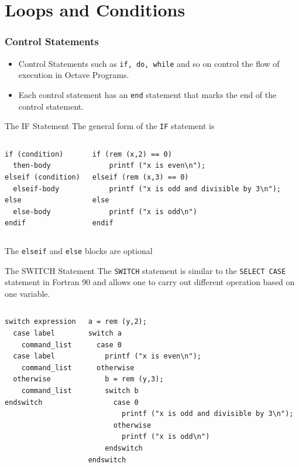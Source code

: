 \documentclass[t,compress,xcolor=svgnames]{beamer}
\newenvironment{eblock}[0]
{
\begin{beamerboxesrounded}[upper=uppercol2,lower=lowercol2,shadow=true]}
{\end{beamerboxesrounded}}
\begin{document}
\section{Loops and Conditions}
\begin{frame}
  \frametitle{\small Control Statements}
  \begin{itemize}
    \item Control Statements such as \texttt{if, do, while} and so on control the flow of execution in Octave Programs.
    \item Each control statement has an \texttt{end} statement that marks the end of the control statement.
  \end{itemize}
  \begin{eblock}{The IF Statement}
    The general form of the \texttt{IF} statement is
    {\tiny
      \begin{columns}
        \column{4cm}
        \begin{verbatim}
if (condition)
  then-body
elseif (condition)
  elseif-body
else
  else-body
endif
        \end{verbatim}
        \column{6cm}
        \begin{verbatim}
if (rem (x,2) == 0)
    printf ("x is even\n");
elseif (rem (x,3) == 0)
    printf ("x is odd and divisible by 3\n");
else
    printf ("x is odd\n")
endif
        \end{verbatim}
      \end{columns}
    }
    The \texttt{elseif} and \texttt{else} blocks are optional
  \end{eblock}

  \begin{eblock}{The SWITCH Statement}
    The \texttt{SWITCH} statement is similar to the \texttt{SELECT CASE} statement in Fortran 90 and allows one to carry out different operation based on one variable.
    {\tiny
      \begin{columns}
        \column{3cm}
        \begin{verbatim}
switch expression
  case label
    command_list
  case label
    command_list
  otherwise
    command_list
endswitch
        \end{verbatim}
        \column{7cm}
        \begin{verbatim}
a = rem (y,2);
switch a
  case 0
    printf ("x is even\n");
  otherwise
    b = rem (y,3);
    switch b
      case 0
        printf ("x is odd and divisible by 3\n");
      otherwise
        printf ("x is odd\n")
    endswitch
endswitch
        \end{verbatim}
      \end{columns}
    }
  \end{eblock}


\end{frame}
\end{document}
